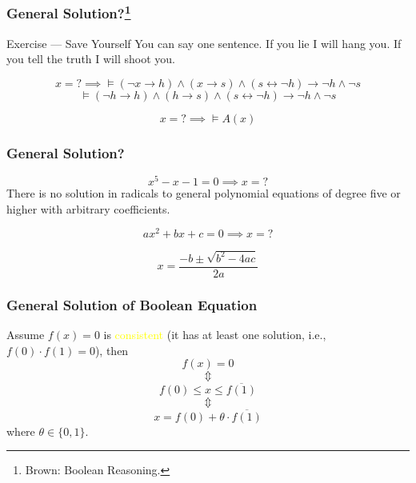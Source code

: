 \documentclass[UTF8,11pt,colorlinks,compress,openany]{beamer}%
\begin{document}
\begin{frame}\frametitle{General Solution?\footnote{Brown: Boolean Reasoning.}}
	\begin{block}{Exercise --- Save Yourself}
		You can say one sentence. If you lie I will hang you. If you tell the truth I will shoot you.
	\end{block}
	\[x=?\implies\vDash(\neg x\to h)\wedge(x\to s)\wedge(s\leftrightarrow\neg h)\to\neg h\wedge\neg s\]
	\[\vDash(\neg h\to h)\wedge(h\to s)\wedge(s\leftrightarrow\neg h)\to\neg h\wedge\neg s\]
	\begin{problem}
		\[x=?\implies\vDash A(x)\]
	\end{problem}
\end{frame}

\begin{frame}\frametitle{General Solution?}
	\[x^5-x-1=0\implies x=?\]
There is no solution in radicals to general polynomial equations of degree five or higher with arbitrary coefficients.

	\[ax^2+bx+c=0\implies x=?\]

	\[x=\frac{-b\pm\sqrt{b^2-4ac}}{2a}\]
\end{frame}

\begin{frame}\frametitle{General Solution of Boolean Equation}
	\begin{theorem}
		Assume $f(x)=0$ is \textcolor{yellow}{consistent} (it has at least one solution, i.e., $f(0)\cdot f(1)=0$), then
		\[f(x)=0\]
		\[\Updownarrow\]
		\[f(0)\leq x\leq\overline{f(1)}\]
		\[\Updownarrow\]
		\[x=f(0)+\theta\cdot\overline{f(1)}\]
		where $\theta\in\{0,1\}$.
	\end{theorem}
\end{frame}
\end{document}
